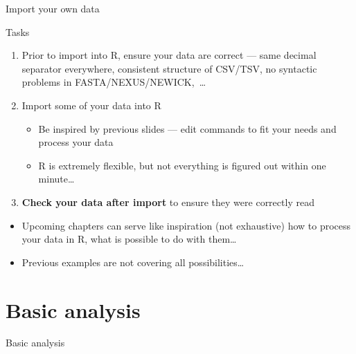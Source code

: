 \documentclass[compress, ucs, xelatex, 11pt, xcolor=svgnames,
	hyperref={
		bookmarks=true,
		unicode=true,
		colorlinks=true,
		pdftitle={Molecular data in R},
		plainpages=false,
		pdfauthor={Vojtech Zeisek},
		pdfsubject={Course about phylogeny and evolution in R},
		pdfcreator={XeLaTeX},
		pdfkeywords={R, evolution, phylogeny, molecular data},
		linkcolor=Tomato,
		anchorcolor=SaddleBrown,
		citecolor=Goldenrod,
		filecolor=DarkMagenta,
		menucolor=Sienna,
		urlcolor=DarkTurquoise,
		pdftex},
	url={hyphens, lowtilde} %
	]{beamer}
\begin{document}
\begin{frame}{Import your own data}
	\begin{block}{Tasks}
		\begin{enumerate}
			\item Prior to import into R, \alert{ensure your data are correct} --- same decimal separator everywhere, consistent structure of CSV/TSV, no syntactic problems in FASTA/NEXUS/NEWICK,~\ldots
			\item Import some of your data into R
			\begin{itemize}
				\item Be inspired by previous slides --- edit commands to fit your needs and process your data
				\item R is extremely flexible, but not everything is figured out within one minute\ldots
			\end{itemize}
			\item \textbf{Check your data after import} to ensure they were correctly read
		\end{enumerate}
	\end{block}
	\begin{itemize}
		\item Upcoming chapters can serve like inspiration (not exhaustive) how to process your data in R, what is possible to do with them\ldots
		\item Previous examples are not covering all possibilities\ldots
	\end{itemize}
\end{frame}

\section{Basic analysis}

\begin{frame}{Basic analysis}
	\tableofcontents[currentsection, sectionstyle=show/hide, hideothersubsections]
\end{frame}
\end{document}
